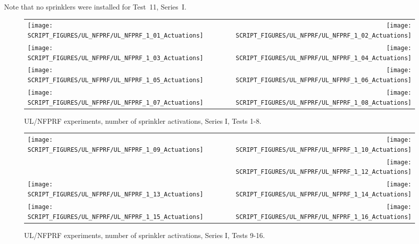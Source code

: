 Note that no sprinklers were installed for Test~11, Series~I.

\newpage

\begin{figure}[p]
\begin{tabular*}{\textwidth}{l@{\extracolsep{\fill}}r}
\texttt{[image: SCRIPT\_FIGURES/UL\_NFPRF/UL\_NFPRF\_1\_01\_Actuations]} &
\texttt{[image: SCRIPT\_FIGURES/UL\_NFPRF/UL\_NFPRF\_1\_02\_Actuations]} \\
\texttt{[image: SCRIPT\_FIGURES/UL\_NFPRF/UL\_NFPRF\_1\_03\_Actuations]} &
\texttt{[image: SCRIPT\_FIGURES/UL\_NFPRF/UL\_NFPRF\_1\_04\_Actuations]} \\
\texttt{[image: SCRIPT\_FIGURES/UL\_NFPRF/UL\_NFPRF\_1\_05\_Actuations]} &
\texttt{[image: SCRIPT\_FIGURES/UL\_NFPRF/UL\_NFPRF\_1\_06\_Actuations]} \\
\texttt{[image: SCRIPT\_FIGURES/UL\_NFPRF/UL\_NFPRF\_1\_07\_Actuations]} &
\texttt{[image: SCRIPT\_FIGURES/UL\_NFPRF/UL\_NFPRF\_1\_08\_Actuations]} \\
\end{tabular*}
\caption{UL/NFPRF experiments, number of sprinkler activations, Series I, Tests 1-8.}
\label{UL_NFPRF_1}
\end{figure}

\begin{figure}[p]
\begin{tabular*}{\textwidth}{l@{\extracolsep{\fill}}r}
\texttt{[image: SCRIPT\_FIGURES/UL\_NFPRF/UL\_NFPRF\_1\_09\_Actuations]} &
\texttt{[image: SCRIPT\_FIGURES/UL\_NFPRF/UL\_NFPRF\_1\_10\_Actuations]} \\
&
\texttt{[image: SCRIPT\_FIGURES/UL\_NFPRF/UL\_NFPRF\_1\_12\_Actuations]} \\
\texttt{[image: SCRIPT\_FIGURES/UL\_NFPRF/UL\_NFPRF\_1\_13\_Actuations]} &
\texttt{[image: SCRIPT\_FIGURES/UL\_NFPRF/UL\_NFPRF\_1\_14\_Actuations]} \\
\texttt{[image: SCRIPT\_FIGURES/UL\_NFPRF/UL\_NFPRF\_1\_15\_Actuations]} &
\texttt{[image: SCRIPT\_FIGURES/UL\_NFPRF/UL\_NFPRF\_1\_16\_Actuations]} \\
\end{tabular*}
\caption{UL/NFPRF experiments, number of sprinkler activations, Series I, Tests 9-16.}
\label{UL_NFPRF_2}
\end{figure}

